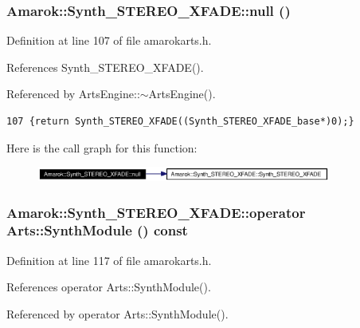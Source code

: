 \subsubsection{ Amarok::Synth\_\-STEREO\_\-XFADE::null ()\hspace{0.3cm}{\tt  [inline, static]}}\label{classAmarok_1_1Synth__STEREO__XFADE_Amarok_1_1Synth__STEREO__XFADEe0}




Definition at line 107 of file amarokarts.h.

References Synth\_\-STEREO\_\-XFADE().

Referenced by Arts\-Engine::$\sim$Arts\-Engine().



\footnotesize\begin{verbatim}107 {return Synth_STEREO_XFADE((Synth_STEREO_XFADE_base*)0);}
\end{verbatim}\normalsize 


Here is the call graph for this function:\begin{figure}[H]
\begin{center}
\leavevmode
\includegraphics[width=274pt]{classAmarok_1_1Synth__STEREO__XFADE_Amarok_1_1Synth__STEREO__XFADEe0_cgraph}
\end{center}
\end{figure}
\subsubsection{\setlength{\rightskip}{0pt plus 5cm}Amarok::Synth\_\-STEREO\_\-XFADE::operator Arts::Synth\-Module () const\hspace{0.3cm}{\tt  [inline]}}\label{classAmarok_1_1Synth__STEREO__XFADE_Amarok_1_1Synth__STEREO__XFADEa7}




Definition at line 117 of file amarokarts.h.

References operator Arts::Synth\-Module().

Referenced by operator Arts::Synth\-Module().



